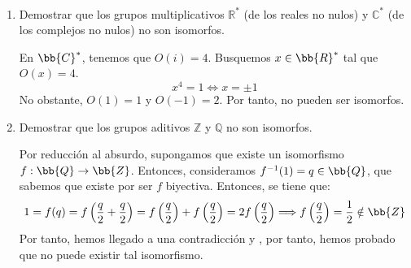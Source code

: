 \begin{ejercicio}\label{ej:2.36}~
    \begin{enumerate}
        \item Demostrar que los grupos multiplicativos $\mathbb{R}^{\ast}$ (de los reales no nulos) y $\mathbb{C}^{\ast}$ (de los complejos no nulos) no son isomorfos.
        
        En $\bb{C}^*$, tenemos que $O(i)=4$. Busquemos $x\in \bb{R}^*$ tal que $O(x)=4$.
        \begin{equation*}
            x^4=1\iff x=\pm 1
        \end{equation*}
        No obstante, $O(1)=1$ y $O(-1)=2$. Por tanto, no pueden ser isomorfos.
        \item Demostrar que los grupos aditivos $\mathbb{Z}$ y $\mathbb{Q}$ no son isomorfos.
        
        Por reducción al absurdo, supongamos que existe un isomorfismo $f:\bb{Q}\to \bb{Z}$. Entonces, consideramos $f^{-1}(1)=q\in \bb{Q}$, que sabemos que existe por ser $f$ biyectiva. Entonces, se tiene que:
        \begin{equation*}
            1=f(q)=f\left(\frac{q}{2}+\frac{q}{2}\right)=f\left(\frac{q}{2}\right)+f\left(\frac{q}{2}\right)=2f\left(\frac{q}{2}\right)
            \Longrightarrow f\left(\frac{q}{2}\right)=\frac{1}{2}\notin \bb{Z}
        \end{equation*}
        Por tanto, hemos llegado a una contradicción y , por tanto, hemos probado que no puede existir tal isomorfismo.
    \end{enumerate}
\end{ejercicio}

